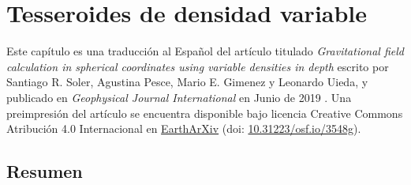 \chapter{Tesseroides de densidad variable}
\label{cha:tesseroids-variable-density}

Este capítulo es una traducción al Español del artículo titulado
\emph{Gravitational field calculation in spherical coordinates using variable
densities in depth} escrito por Santiago R. Soler, Agustina Pesce, Mario E.
Gimenez y Leonardo Uieda, y publicado en \emph{Geophysical Journal
International} en Junio de 2019 \citep{soler2019}.
Una preimpresión del artículo se encuentra disponible bajo licencia Creative
Commons Atribución 4.0 Internacional en
\href{https://eartharxiv.org/}{EarthArXiv} (doi:
\href{https://doi.org/10.31223/osf.io/3548g}{10.31223/osf.io/3548g}).

\section{Resumen}

